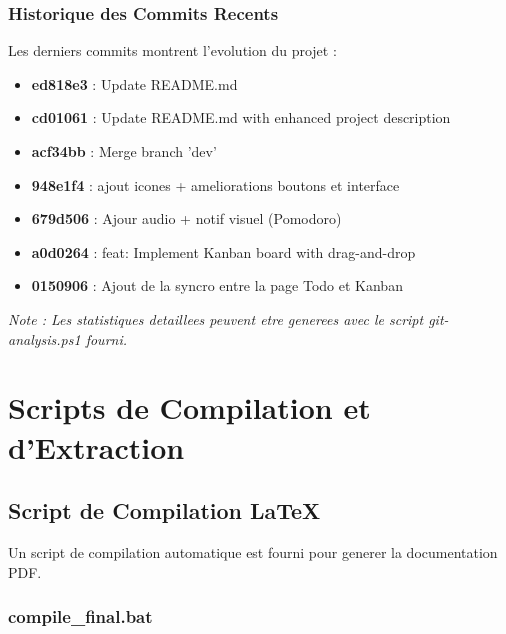 \documentclass[12pt,a4paper]{article}
\begin{document}
\subsubsection{Historique des Commits Recents}

Les derniers commits montrent l'evolution du projet :

\begin{itemize}
    \item \textbf{ed818e3} : Update README.md
    \item \textbf{cd01061} : Update README.md with enhanced project description
    \item \textbf{acf34bb} : Merge branch 'dev' 
    \item \textbf{948e1f4} : ajout icones + ameliorations boutons et interface
    \item \textbf{679d506} : Ajour audio + notif visuel (Pomodoro)
    \item \textbf{a0d0264} : feat: Implement Kanban board with drag-and-drop
    \item \textbf{0150906} : Ajout de la syncro entre la page Todo et Kanban
\end{itemize}

\textit{Note : Les statistiques detaillees peuvent etre generees avec le script git-analysis.ps1 fourni.}

\section{Scripts de Compilation et d'Extraction}

\subsection{Script de Compilation LaTeX}

Un script de compilation automatique est fourni pour generer la documentation PDF.

\subsubsection{compile\_final.bat}
\end{document}
